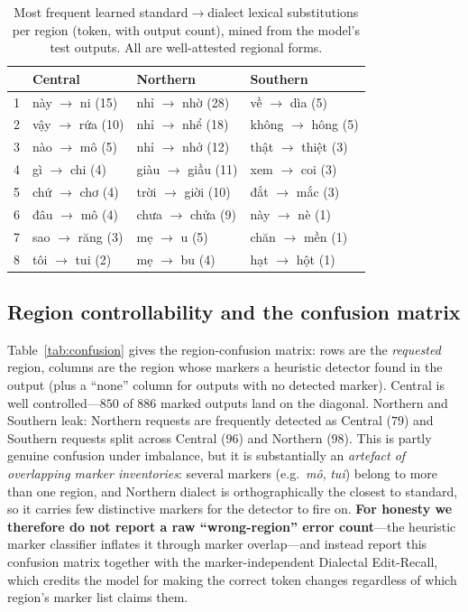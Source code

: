 \documentclass[11pt]{article}
\begin{document}
\begin{table}[t]
  \centering
  \footnotesize
  \caption{Most frequent learned standard$\rightarrow$dialect lexical
  substitutions per region (token, with output count), mined from the model's test
  outputs. All are well-attested regional forms.}
  \label{tab:subs}
  \begin{tabular}{l l l l}
    \toprule
    & \textbf{Central} & \textbf{Northern} & \textbf{Southern}\\
    \midrule
    1 & này $\rightarrow$ ni (15)   & nhỉ $\rightarrow$ nhờ (28)   & về $\rightarrow$ dìa (5)\\
    2 & vậy $\rightarrow$ rứa (10)  & nhỉ $\rightarrow$ nhể (18)   & không $\rightarrow$ hông (5)\\
    3 & nào $\rightarrow$ mô (5)    & nhỉ $\rightarrow$ nhở (12)   & thật $\rightarrow$ thiệt (3)\\
    4 & gì $\rightarrow$ chi (4)    & giàu $\rightarrow$ giầu (11) & xem $\rightarrow$ coi (3)\\
    5 & chứ $\rightarrow$ chơ (4)   & trời $\rightarrow$ giời (10) & đắt $\rightarrow$ mắc (3)\\
    6 & đâu $\rightarrow$ mô (4)    & chưa $\rightarrow$ chửa (9)  & này $\rightarrow$ nè (1)\\
    7 & sao $\rightarrow$ răng (3)  & mẹ $\rightarrow$ u (5)       & chăn $\rightarrow$ mền (1)\\
    8 & tôi $\rightarrow$ tui (2)   & mẹ $\rightarrow$ bu (4)      & hạt $\rightarrow$ hột (1)\\
    \bottomrule
  \end{tabular}
\end{table}

\subsection{Region controllability and the confusion matrix}
\label{sec:analysis-region}

Table~\ref{tab:confusion} gives the region-confusion matrix: rows are the
\emph{requested} region, columns are the region whose markers a heuristic detector
found in the output (plus a ``none'' column for outputs with no detected marker).
Central is well controlled---$850$ of $886$ marked outputs land on the diagonal.
Northern and Southern leak: Northern requests are frequently detected as Central
($79$) and Southern requests split across Central ($96$) and Northern ($98$). This
is partly genuine confusion under imbalance, but it is substantially an
\emph{artefact of overlapping marker inventories}: several markers (e.g.\
\emph{mô}, \emph{tui}) belong to more than one region, and Northern dialect is
orthographically the closest to standard, so it carries few distinctive markers
for the detector to fire on. \textbf{For honesty we therefore do not report a raw
``wrong-region'' error count}---the heuristic marker classifier inflates it through
marker overlap---and instead report this confusion matrix together with the
marker-independent Dialectal Edit-Recall, which credits the model for making the
correct token changes regardless of which region's marker list claims them.
\end{document}
